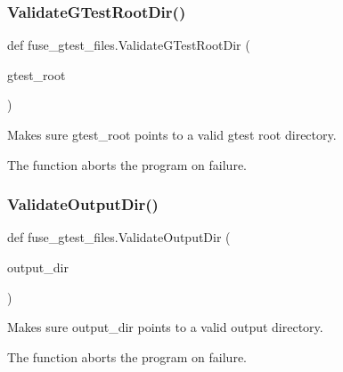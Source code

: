 \mbox{\label{namespacefuse__gtest__files_aa53690cd3c4ff01cfeea470f363f1dec}} 
\subsubsection{\texorpdfstring{Validate\+G\+Test\+Root\+Dir()}{ValidateGTestRootDir()}}
{\footnotesize\ttfamily def fuse\+\_\+gtest\+\_\+files.\+Validate\+G\+Test\+Root\+Dir (\begin{DoxyParamCaption}\item[{}]{gtest\+\_\+root }\end{DoxyParamCaption})}

\begin{DoxyVerb}Makes sure gtest_root points to a valid gtest root directory.

The function aborts the program on failure.
\end{DoxyVerb}
 \mbox{\label{namespacefuse__gtest__files_a9f584226b1f996ffff820e0751dbd458}} 
\subsubsection{\texorpdfstring{Validate\+Output\+Dir()}{ValidateOutputDir()}}
{\footnotesize\ttfamily def fuse\+\_\+gtest\+\_\+files.\+Validate\+Output\+Dir (\begin{DoxyParamCaption}\item[{}]{output\+\_\+dir }\end{DoxyParamCaption})}

\begin{DoxyVerb}Makes sure output_dir points to a valid output directory.

The function aborts the program on failure.
\end{DoxyVerb}
 \mbox{\label{namespacefuse__gtest__files_a333eb5237899fe2f80b0c624ddba363d}} 
